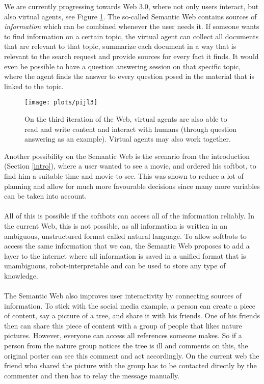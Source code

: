 \documentclass{article}
\begin{document}
 We are currently progressing towards Web 3.0, where not only users interact, but also virtual agents, see Figure \ref{web3}. The so-called Semantic Web contains sources of \textit{information} which can be combined whenever the user needs it. 
 If someone wants to find information on a certain topic, the virtual agent can collect all documents that are relevant to that topic, summarize each document in a way that is relevant to the search request and provide sources for every fact it finds. It would even be possible to have a question answering session on that specific topic, where the agent finds the answer to every question posed in the material that is linked to the topic.
 
 \begin{figure}[H]
 \centering
 \texttt{[image: plots/pijl3]}
 \caption[Web 3.0]{On the third iteration of the Web, virtual agents are also able to read and write content and interact with humans (through question answering as an example). Virtual agents may also work together.}
 \label{web3}
 \end{figure}
 
 Another possibility on the Semantic Web is the scenario from the introduction (Section \ref{intro}), where a user wanted to see a movie, and ordered his softbot, to find him a suitable time and movie to see. This was shown to reduce a lot of planning and allow for much more favourable decisions since many more variables can be taken into account.
 \paragraph{}
 All of this is possible if the softbots can access all of the information reliably. In the current Web, this is not possible, as all information is written in an ambiguous, unstructured format called natural language. To allow softbots to access the same information that we can, the Semantic Web proposes to add a layer to the internet where all information is saved in a unified format that is unambiguous, robot-interpretable and can be used to store any type of knowledge.
 \paragraph{}
  The Semantic Web also improves user interactivity by connecting sources of information. To stick with the social media example, a person can create a piece of content, say a picture of a tree, and share it with his friends. One of his friends then can share this piece of content with a group of people that likes nature pictures. However, everyone can access all references someone makes. So if a person from the nature group notices the tree is ill and comments on this, the original poster can see this comment and act accordingly. On the current web the friend who shared the picture with the group has to be contacted directly by the commenter and then has to relay the message manually.
 
\end{document}
